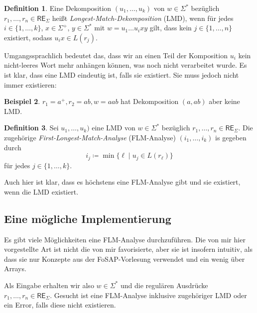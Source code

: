 \documentclass[11pt, a4paper]{article}
\theoremstyle{definition}
\newtheorem{definition}{Definition}
\newtheorem{example}[definition]{Beispiel}
\theoremstyle{plain}
\begin{document}
\begin{definition}
	Eine Dekomposition \( (u_1, \ldots, u_k) \) von \( w \in \Sigma^\ast \) bezüglich \( r_1, \ldots, r_n \in \mathsf{RE}_\Sigma \) heißt \textit{Longest-Match-Dekomposition} (LMD), wenn für jedes \( i \in \{1, \ldots, k\} \), \( x \in \Sigma^+ \), \( y \in \Sigma^\ast \) mit \( w = u_1 \ldots u_i x y \) gilt, dass kein \( j \in \{1, \ldots, n\} \) existiert, sodass \( u_i x \in L(r_j) \). 
\end{definition}
Umgangssprachlich bedeutet das, dass wir an einen Teil der Komposition \( u_i \) kein nicht-leeres Wort mehr anhängen können, was noch nicht verarbeitet wurde.
Es ist klar, dass eine LMD eindeutig ist, falls sie existiert. Sie muss jedoch nicht immer existieren:

\begin{example}
	\( r_1 = a^+, r_2 = ab, w = aab \) hat Dekomposition \( (a, ab) \) aber keine LMD.
\end{example}

\begin{definition}
	Sei \( u_1, \ldots, u_k) \) eine LMD von \( w \in \Sigma^\ast \) bezüglich \( r_1, \ldots, r_n \in \mathsf{RE}_\Sigma \). Die zugehörige \textit{First-Longest-Match-Analyse} (FLM-Analyse) \( (i_1, \ldots, i_k) \) is gegeben durch
	\[
		i_j \coloneqq \min \{ \ell \mid u_j \in L(r_\ell) \}
	\]
	für jedes \( j \in \{1, \ldots, k\} \).
\end{definition}
Auch hier ist klar, dass es höchstens eine FLM-Analyse gibt und sie existiert, wenn die LMD existiert.


\subsection*{Eine mögliche Implementierung}
Es gibt viele Möglichkeiten eine FLM-Analyse durchzuführen. Die von mir hier vorgestellte Art ist nicht die von mir favorisierte, aber sie ist insofern intuitiv, als dass sie nur Konzepte aus der FoSAP-Vorlesung verwendet und ein wenig über Arrays.

Als Eingabe erhalten wir also \( w \in \Sigma^\ast \) und die regulären Ausdrücke \( r_1, \ldots, r_n \in \mathsf{RE}_\Sigma \). Gesucht ist eine FLM-Analyse inklusive zugehöriger LMD oder ein Error, falls diese nicht existieren.
\end{document}
